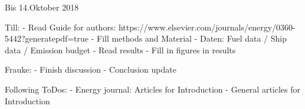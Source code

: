 Bis 14.Oktober 2018

Till:
- Read Guide for authors: https://www.elsevier.com/journals/energy/0360-5442?generatepdf=true
- Fill methods and Material
- Daten: Fuel data / Ship data / Emission budget
- Read results
- Fill in figures in results

Frauke:
-	Finish discussion
-	Conclusion update

Following ToDos:
-	Energy journal: Articles for Introduction
-	General articles for Introduction
